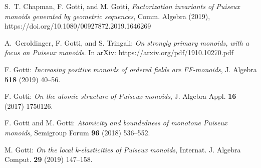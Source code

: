 \documentclass[11pt]{article}
\begin{document}

\begin{thebibliography}{99}
	
	 S.~T. Chapman, F. Gotti, and M. Gotti, \emph{Factorization invariants of Puiseux monoids generated by geometric sequences}, Comm. Algebra (2019), https://doi.org/10.1080/00927872.2019.1646269
	
	 A.~Geroldinger, F. Gotti, and S. Tringali: \emph{On strongly primary monoids, with a focus on Puiseux monoids}. In arXiv: https://arxiv.org/pdf/1910.10270.pdf
	
	 F. Gotti: \emph{Increasing positive monoids of ordered fields are FF-monoids}, J. Algebra \textbf{518} (2019) 40--56.
	
	 F. Gotti: \emph{On the atomic structure of Puiseux monoids}, J. Algebra Appl. \textbf{16} (2017) 1750126.
	
	 F. Gotti and M. Gotti: \emph{Atomicity and boundedness of monotone Puiseux monoids}, Semigroup Forum \textbf{96} (2018) 536--552.
	
	 M. Gotti: \emph{On the local k-elasticities of Puiseux monoids}, Internat. J. Algebra Comput. {\bf 29} (2019) 147--158.
	
\end{thebibliography}
\end{document}
